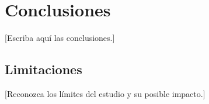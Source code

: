 \section{Conclusiones}

[Escriba aquí las conclusiones.]

\subsection{Limitaciones}
[Reconozca los límites del estudio y su posible impacto.]
